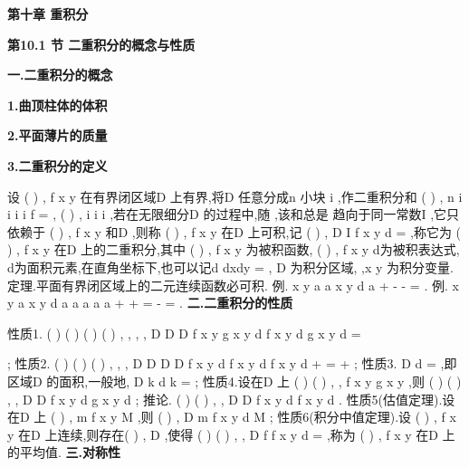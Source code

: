 \begin{center}
{\Large \bfseries \textcolor{lyred}{第十章 重积分}}
\end{center}

\vspace{6pt}
{\large \bfseries \textcolor{lyred}{第10.1 节 二重积分的概念与性质}}

\vspace{4pt}
{\bfseries \textcolor{lyred}{一.二重积分的概念}}

{\bfseries \textcolor{lyred}{1.曲顶柱体的体积}}

{\bfseries \textcolor{lyred}{2.平面薄片的质量}}

{\bfseries \textcolor{lyred}{3.二重积分的定义}}

设
(
)
,
f x y 在有界闭区域D 上有界,将D 任意分成n 小块
i
\sigma 
\Delta 
,作二重积分和 
(
)
,
n
i
i
i
i
f \psi \eta 
\sigma 
=
\Delta 
\sum 
, (
)
,
i
i
i
\psi \eta 
\sigma 
\forall 
\in \Delta 
,若在无限细分D 的过程中,随
\lambda \to 
,该和总是 
趋向于同一常数I ,它只依赖于
(
)
,
f x y 和D ,则称
(
)
,
f x y 在D 上\textcolor{lyred}{可积},记 
(
)
,
D
I
f x y d\sigma 
=\int \int 
,称它为
(
)
,
f x y 在D 上的\textcolor{lyred}{二重积分},其中
(
)
,
f x y 为\textcolor{lyred}{被积函数}, 
(
)
,
f x y d\sigma 为\textcolor{lyred}{被积表达式}, d\sigma 为\textcolor{lyred}{面积元素},在直角坐标下,也可以记d
dxdy
\sigma =
, 
D 为\textcolor{lyred}{积分区域}, ,x y 为\textcolor{lyred}{积分变量}. 
\textcolor{lyred}{定理}.平面有界闭区域上的二元连续函数必可积. 
\textcolor{lyred}{例}.
x
y
a
a
x
y d
a
\sigma 
\pi 
+
\le 
-
-
=
\int \int 
. 
\textcolor{lyred}{例}.
x
y
a
x
y d
a
a
a
a
a
\sigma 
\pi 
\pi 
\pi 
+
\le 
+
=
\cdots 
-
\cdots 
=
\int \int 
. 
\vspace{4pt}
{\bfseries \textcolor{lyred}{二.二重积分的性质}}

\textcolor{lyred}{性质1}.
(
)
(
)
(
)
(
)
,
,
,
,
D
D
D
f x y
g x y
d
f x y d
g x y d
\alpha 
\beta 
\sigma 
\alpha 
\sigma 
\beta 
\sigma 
\pm 
=
\pm 




\int \int 
\int \int 
\int \int 
; 
\textcolor{lyred}{性质2}.
(
)
(
)
(
)
,
,
,
D
D
D
D
f
x y d
f x y d
f
x y d
\sigma 
\sigma 
\sigma 
+
=
+
\int \int 
\int \int 
\int \int 
; 
\textcolor{lyred}{性质3}.
D
d\sigma 
\sigma 
\cdots 
=
\int \int 
,即区域D 的面积,一般地,
D
k d
k
\sigma 
\sigma 
\cdots 
=
\int \int 
; 
\textcolor{lyred}{性质4}.设在D 上
(
)
(
)
,
,
f x y
g x y
\le 
,则
(
)
(
)
,
,
D
D
f x y d
g x y d
\sigma 
\sigma 
\le 
\int \int 
\int \int 
; 
\textcolor{lyred}{推论}.
(
)
(
)
,
,
D
D
f x y d
f x y d
\sigma 
\sigma 
\le 
\int \int 
\int \int 
. 
\textcolor{lyred}{性质5(估值定理)}.设在D 上
(
)
,
m
f x y
M
\le 
\le 
,则
(
)
,
D
m
f x y d
M
\sigma 
\sigma 
\sigma 
\le 
\le 
\int \int 
; 
\textcolor{lyred}{性质6(积分中值定理)}.设
(
)
,
f x y 在D 上连续,则存在(
)
,
D
\psi \eta \in 
,使得 
(
)
(
)
,
,
D
f
f
x y d
\psi \eta 
\sigma 
\sigma 
=
\int \int 
,称为
(
)
,
f x y 在D 上的\textcolor{lyred}{平均值}. 
\vspace{4pt}
{\bfseries \textcolor{lyred}{三.对称性}}

